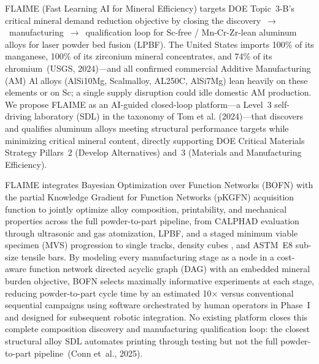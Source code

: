 \documentclass[11pt,letterpaper]{article}
\begin{document}
FLAIME (Fast Learning AI for Mineral Efficiency) targets DOE Topic~3-B's
critical mineral demand reduction objective by closing the
discovery~$\to$~manufacturing~$\to$~qualification loop for
Sc-free / Mn-Cr-Zr-lean aluminum alloys for laser powder bed fusion
(LPBF). The United States imports 100\% of its manganese, 100\% of its
zirconium mineral concentrates, and 74\% of its chromium~(USGS, 2024)---and
all confirmed commercial Additive Manufacturing (AM) Al alloys (AlSi10Mg, Scalmalloy, AL250C,
AlSi7Mg) lean heavily on these elements or on Sc; a single supply disruption
could idle domestic AM production. We propose FLAIME as an AI-guided
closed-loop platform---a Level~3 self-driving laboratory (SDL) in the
taxonomy of Tom et al. (2024)---that discovers and qualifies aluminum alloys
meeting structural performance targets while minimizing critical mineral
content, directly supporting DOE Critical Materials Strategy Pillars~2
(Develop Alternatives) and~3 (Materials and Manufacturing Efficiency).

FLAIME integrates Bayesian Optimization over Function Networks (BOFN) with
the partial Knowledge Gradient for Function Networks (pKGFN) acquisition
function to jointly optimize alloy composition, printability, and mechanical
properties across the full powder-to-part pipeline, from CALPHAD evaluation
through ultrasonic and gas atomization, LPBF,
and a staged minimum viable specimen (MVS) progression to single tracks,
density cubes 
, and ASTM~E8 sub-size
tensile bars. By modeling every manufacturing stage as a node in
a cost-aware function network directed acyclic graph (DAG) with an embedded mineral burden objective,
BOFN selects maximally informative experiments at each stage, reducing
powder-to-part cycle time by an estimated 10$\times$ versus conventional
sequential campaigns 
using software orchestrated by human operators in Phase~I and
designed for subsequent robotic integration.  No existing
platform closes this complete composition discovery and
manufacturing qualification loop: the closest structural alloy SDL
automates printing through testing but not the full
powder-to-part pipeline~(Conn et~al., 2025).
\end{document}
